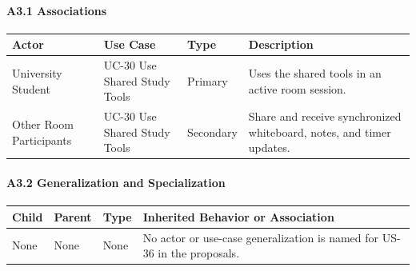 \documentclass[12pt]{article}
\renewcommand{\baselinestretch}{1.5}
\begin{document}
\hypertarget{sec:a3-1-associations}{}
\paragraph*{A3.1 Associations}
\par\medskip

\begingroup
\small
\renewcommand{\baselinestretch}{1.0}\selectfont
\renewcommand{\arraystretch}{1.15}
\setlength{\tabcolsep}{6pt}
\begin{longtable}{|>{\raggedright\arraybackslash}p{}|>{\raggedright\arraybackslash}p{}|>{\raggedright\arraybackslash}p{}|>{\raggedright\arraybackslash}p{}|}
\hline
\textbf{Actor} & \textbf{Use Case} & \textbf{Type} & \textbf{Description} \\ \hline
\endhead
University Student & UC-30 Use Shared Study Tools & Primary & Uses the shared tools in an active room session. \\ \hline
Other Room Participants & UC-30 Use Shared Study Tools & Secondary & Share and receive synchronized whiteboard, notes, and timer updates. \\ \hline
\end{longtable}
\endgroup
\par\medskip

\hypertarget{sec:a3-2-generalization-and-specialization}{}
\paragraph*{A3.2 Generalization and Specialization}
\par\medskip

\begingroup
\small
\renewcommand{\baselinestretch}{1.0}\selectfont
\renewcommand{\arraystretch}{1.15}
\setlength{\tabcolsep}{6pt}
\begin{longtable}{|>{\raggedright\arraybackslash}p{}|>{\raggedright\arraybackslash}p{}|>{\raggedright\arraybackslash}p{}|>{\raggedright\arraybackslash}p{}|}
\hline
\textbf{Child} & \textbf{Parent} & \textbf{Type} & \textbf{Inherited Behavior or Association} \\ \hline
\endhead
None & None & None & No actor or use-case generalization is named for US-36 in the proposals. \\ \hline
\end{longtable}
\endgroup
\par\medskip

\hypertarget{sec:a3-3-include}{}
\end{document}
